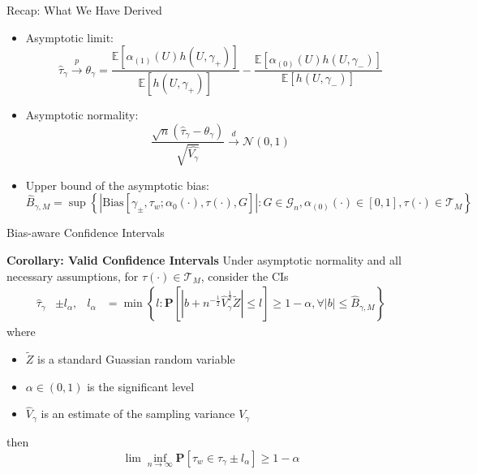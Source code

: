  \begin{frame}{Recap: What We Have Derived}
    \begin{itemize}
        \item<2-> Asymptotic limit: 
        $$
         \hat{\tau}_{\gamma}\xrightarrow{p}\theta_{\gamma}=\frac{\mathbb{E}\left[\alpha_{\left(1\right)}\left(U\right)h\left(U,\gamma_{+}\right)\right]}{\mathbb{E}\left[h\left(U,\gamma_{+}\right)\right]}-\frac{\mathbb{E}\left[\alpha_{\left(0\right)}\left(U\right)h\left(U,\gamma_{-}\right)\right]}{\mathbb{E}\left[h\left(U,\gamma_{-}\right)\right]}
        $$
        \item<3-> Asymptotic normality:
        $$
        \frac{\sqrt{n}\left(\hat{\tau}_{\gamma}-\theta_{\gamma}\right)}{\sqrt{\hat{V_{\gamma}}}}\xrightarrow{d}\mathcal{N}\left(0,1\right)
        $$
        \item<4-> Upper bound of the asymptotic bias:  
        $$
        \hat{B}_{\gamma,M}=\sup\left\{ \left|\mathrm{Bias}\left[\gamma_{\pm},\tau_{w};\alpha_{0}\left(\cdot\right),\tau\left(\cdot\right),G\right]\right|:G\in\mathcal{G}_{n},\alpha_{\left(0\right)}\left(\cdot\right)\in\left[0,1\right],\tau\left(\cdot\right)\in\mathcal{T}_{M}\right\} 
        $$
    \end{itemize}
    
 \end{frame}

 \begin{frame}{Bias-aware Confidence Intervals}

    \begin{block}{\textbf{Corollary: Valid Confidence Intervals}}
        \small
        Under asymptotic normality and all necessary assumptions, for $\tau(\cdot)\in \mathcal{T}_M$, consider the CIs
        \begin{align*}
            \hat{\tau}_{\gamma}&\pm l_{\alpha}, &l_{\alpha}&=\min\left\{ l:\mathbf{P}\left[\left|b+n^{-\frac{1}{2}}\hat{V}_{\gamma}^{\frac{1}{2}}\tilde{Z}\right|\leq l\right]\geq1-\alpha,\forall\left|b\right|\leq\hat{B}_{\gamma,M}\right\} 
        \end{align*}
        where
        \begin{itemize}
            \item $\tilde{Z}$ is a standard Guassian random variable
            \item $\alpha\in\left(0,1\right)$ is the significant level
            \item $\hat{V}_{\gamma}$ is an estimate of the sampling variance $V_{\gamma}$
        \end{itemize}
        then
        $$
        \lim\inf_{n\rightarrow\infty}\mathbf{P}\left[\tau_{w}\in\hat{\tau}_{\gamma}\pm l_{\alpha}\right]\geq1-\alpha
        $$
        
    \end{block}
    
 \end{frame}

